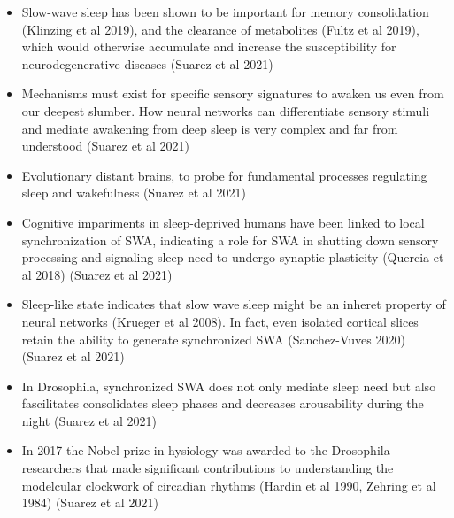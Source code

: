 \documentclass[11pt]{article}
\begin{document}
\begin{itemize}
    \item Slow-wave sleep has been shown to be important for memory consolidation (Klinzing et al 2019),
    and the clearance of metabolites (Fultz et al 2019), which would otherwise accumulate and increase the
    susceptibility for neurodegenerative diseases \parencite{suarez-grimaltNeuralArchitectureSleep2021}
    (Suarez et al 2021)

    \item Mechanisms must exist for specific sensory signatures to awaken us even from our
    deepest slumber. How neural networks can differentiate sensory stimuli
    and mediate awakening from deep sleep is very complex and far from understood \parencite{suarez-grimaltNeuralArchitectureSleep2021}
    (Suarez et al 2021)

    \item Evolutionary distant brains, to probe for fundamental processes regulating
    sleep and wakefulness \parencite{suarez-grimaltNeuralArchitectureSleep2021}
    (Suarez et al 2021)

    \item Cognitive impariments in sleep-deprived humans have been linked to local
    synchronization of SWA, indicating a role for SWA in shutting down sensory
    processing and signaling sleep need to undergo synaptic plasticity (Quercia et al 2018)
    \parencite{suarez-grimaltNeuralArchitectureSleep2021}
    (Suarez et al 2021)

    \item Sleep-like state indicates that slow wave sleep might be an inheret property
    of neural networks (Krueger et al 2008). In fact, even isolated cortical slices retain the ability
    to generate synchronized SWA (Sanchez-Vuves 2020) \parencite{suarez-grimaltNeuralArchitectureSleep2021}
    (Suarez et al 2021)

    \item In Drosophila, synchronized SWA does not only mediate sleep need but also
    fascilitates consolidates sleep phases and decreases arousability during the
    night \parencite{suarez-grimaltNeuralArchitectureSleep2021,raccugliaNetworkSpecificSynchronizationElectrical2019}
    (Suarez et al 2021)

    \item In 2017 the Nobel prize in hysiology was awarded to the Drosophila
    researchers that made significant contributions to understanding the
    modelcular clockwork of circadian rhythms (Hardin et al 1990, Zehring et al 1984)
    \parencite{suarez-grimaltNeuralArchitectureSleep2021}
    (Suarez et al 2021)


\end{itemize}
\end{document}
